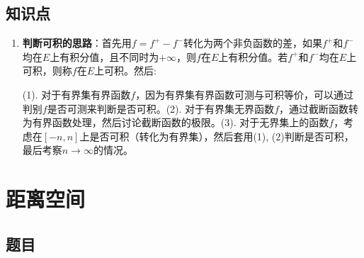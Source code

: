 \documentclass{article}
\begin{document}
\subsection{知识点}
\begin{enumerate}
    \item \textbf{判断可积的思路}：首先用$f=f^{+}-f^{-}$转化为两个非负函数的差，如果$f^{+}$和$f^{-}$均在$E$上有积分值，且不同时为$+\infty$，则$f$在$E$上有积分值。若$f^{+}$和$f^{-}$均在$E$上可积，则称$f$在$E$上可积。然后:

(1). 对于有界集有界函数$f$，因为有界集有界函数可测与可积等价，可以通过判别$f$是否可测来判断是否可积。(2). 对于有界集无界函数$f$，通过截断函数转为有界函数处理，然后讨论截断函数的极限。(3). 对于无界集上的函数$f$，考虑在$[-n,n]$上是否可积（转化为有界集），然后套用(1), (2)判断是否可积，最后考察$n \to \infty$的情况。
\end{enumerate}

\section{距离空间}
\subsection{题目}
\end{document}

